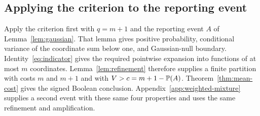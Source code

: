 \subsection{Applying the criterion to the reporting event}

Apply the criterion first with $q=m+1$ and the reporting event $A$ of
Lemma~\ref{lem:gaussian}. That lemma gives positive probability,
conditional variance of the coordinate sum below one, and Gaussian-null
boundary. Identity~\eqref{eq:indicator} gives the required pointwise
expansion into functions of at most $m$ coordinates.
Lemma~\ref{lem:refinement} therefore supplies a finite partition with costs
$m$ and $m+1$ and with $V>c=m+1-\mathbb P(A)$.
Theorem~\ref{thm:mean-cost} gives the signed Boolean conclusion.
Appendix~\ref{app:weighted-mixture} supplies a second event with these
same four properties and uses the same refinement and amplification.

